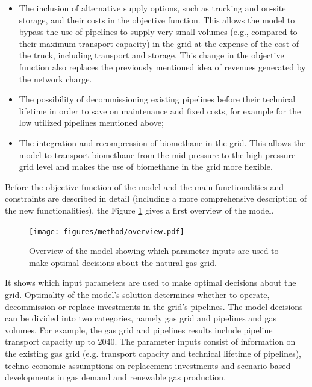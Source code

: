 \begin{itemize}
	\item The inclusion of alternative supply options, such as trucking and on-site storage, and their costs in the objective function. This allows the model to bypass the use of pipelines to supply very small volumes (e.g., compared to their maximum transport capacity) in the grid at the expense of the cost of the truck, including transport and storage. This change in the objective function also replaces the previously mentioned idea of revenues generated by the network charge. 
	\item The possibility of decommissioning existing pipelines before their technical lifetime in order to save on maintenance and fixed costs, for example for the low utilized pipelines mentioned above;
	\item The integration and recompression of biomethane in the grid. This allows the model to transport biomethane from the mid-pressure to the high-pressure grid level and makes the use of biomethane in the grid more flexible. 
\end{itemize}

Before the objective function of the model and the main functionalities and constraints are described in detail (including a more comprehensive description of the new functionalities), the Figure \ref{method:overview} gives a first overview of the model. 

 \begin{figure}[h]
 	\centering
 	\texttt{[image: figures/method/overview.pdf]}
 	\caption{Overview of the model showing which parameter inputs are used to make optimal decisions about the natural gas grid.}
 	\label{method:overview}
 \end{figure}
 
 It shows which input parameters are used to make optimal decisions about the grid. Optimality of the model's solution determines whether to operate, decommission or replace investments in the grid's pipelines. The model decisions can be divided into two categories, namely gas grid and pipelines and gas volumes. For example, the gas grid and pipelines results include pipeline transport capacity up to 2040. The parameter inputs consist of information on the existing gas grid (e.g. transport capacity and technical lifetime of pipelines), techno-economic assumptions on replacement investments and scenario-based developments in gas demand and renewable gas production.  

